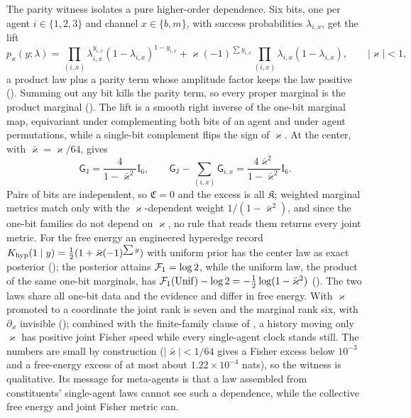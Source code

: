 The parity witness isolates a pure higher-order dependence. Six bits, one per agent
$i\in\{1,2,3\}$ and channel $x\in\{b,m\}$, with success probabilities $\lambda_{i,x}$, get the lift
\[
p_\varkappa(y;\lambda)
=\prod_{(i,x)}\lambda_{i,x}^{y_{i,x}}(1-\lambda_{i,x})^{1-y_{i,x}}
+\varkappa(-1)^{\sum y_{i,x}}\prod_{(i,x)}\lambda_{i,x}(1-\lambda_{i,x}),
\qquad|\varkappa|<1,
\]
a product law plus a parity term whose amplitude factor keeps the law positive
(). Summing out any bit kills the parity term, so every proper
marginal is the product marginal (). The lift is a smooth right
inverse of the one-bit marginal map, equivariant under complementing both bits of an agent and under
agent permutations, while a single-bit complement flips the sign of $\varkappa$. At the center, with
$\bar\varkappa=\varkappa/64$,  gives
\[
\mathsf G_{\mathrm J}=\frac{4}{1-\bar\varkappa^2}\mathrm I_6,
\qquad
\mathsf G_{\mathrm J}-\sum_{(i,x)}\mathsf G_{i,x}=\frac{4\bar\varkappa^2}{1-\bar\varkappa^2}\mathrm I_6 .
\]
Pairs of bits are independent, so $\mathfrak C=0$ and the excess is all $\mathfrak K$; weighted
marginal metrics match only with the $\varkappa$-dependent weight $1/(1-\bar\varkappa^2)$, and since
the one-bit families do not depend on $\varkappa$, no rule that reads them returns every joint
metric. For the free energy an engineered hyperedge record
$K_{\mathrm{hyp}}(1\mid y)=\tfrac12(1+\bar\varkappa(-1)^{\sum y})$ with uniform prior has the center
law as exact posterior (); the posterior attains $\mathcal F_1=\log2$,
while the uniform law, the product of the same one-bit marginals, has
$\mathcal F_1(\operatorname{Unif})-\log2=-\tfrac12\log(1-\bar\varkappa^2)$
(). The two laws share all one-bit data and the evidence and differ
in free energy. With $\varkappa$ promoted to a coordinate the joint rank is seven and the marginal
rank six, with $\partial_\varkappa$ invisible (); combined with the
finite-family clause of , a history moving only $\varkappa$ has
positive joint Fisher speed while every single-agent clock stands still. The numbers are small by
construction ($|\bar\varkappa|<1/64$ gives a Fisher excess below $10^{-3}$ and a free-energy excess of
at most about $1.22\times10^{-4}$ nats), so the witness is qualitative. Its message for meta-agents is
that a law assembled from constituents' single-agent laws cannot see such a dependence, while the
collective free energy and joint Fisher metric can.

